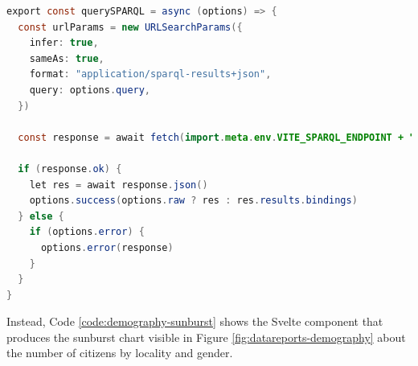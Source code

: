 \begin{lstlisting}[language=Java,caption={The querySPARQL function.},label=code:query-sparql]
export const querySPARQL = async (options) => {
  const urlParams = new URLSearchParams({
    infer: true,
    sameAs: true,
    format: "application/sparql-results+json",
    query: options.query,
  })

  const response = await fetch(import.meta.env.VITE_SPARQL_ENDPOINT + "?" + urlParams.toString());

  if (response.ok) {
    let res = await response.json()
    options.success(options.raw ? res : res.results.bindings)
  } else {
    if (options.error) {
      options.error(response)
    }
  }
}
\end{lstlisting}

Instead, Code \ref{code:demography-sunburst} shows the Svelte component that produces the sunburst chart visible in Figure \ref{fig:datareports-demography} about the number of citizens by locality and gender.

